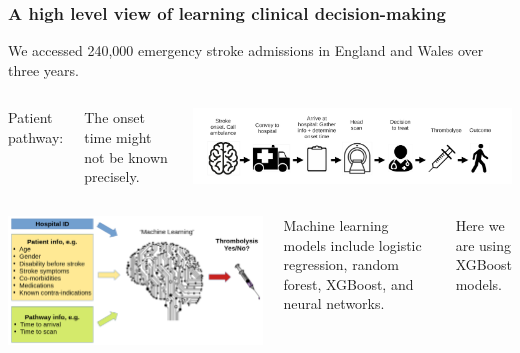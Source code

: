 \documentclass[xcolor={usenames,dvipsnames}]{beamer}
\begin{document}
\begin{frame}
\frametitle{A high level view of learning clinical decision-making}

We accessed 240,000 emergency stroke admissions in England and Wales over three years. %

\begin{columns}
    \footnotesize{Patient pathway: } 
    
    \vspace{0.5em} 
    \tiny{The onset time might not be known precisely.} 
    
    \begin{center}
    \includegraphics[width=\textwidth]{./images/pathway}
    \end{center}
\end{columns}


\begin{columns}
    \includegraphics[width=1.0\textwidth]{./images/treatment_decision}

    \footnotesize
    Machine learning models include logistic regression,
    random forest, XGBoost, and neural networks. 
    
    \vspace{1em}
    
    Here we are using XGBoost models.
    \normalsize 
\end{columns}




\end{frame}
\end{document}
